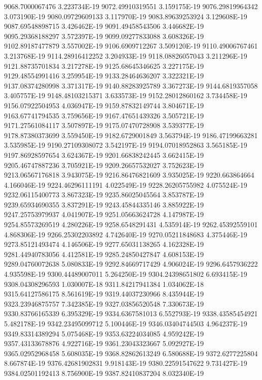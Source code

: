 9068.7000067476  3.223734E-19
9072.49910319551  3.159175E-19
9076.29819964342  3.073190E-19
9080.09729609133  3.117970E-19
9083.89639253924  3.129608E-19
9087.69548898715  3.426462E-19
9091.49458543506  3.446682E-19
9095.29368188297  3.572397E-19
9099.09277833088  3.608326E-19
9102.89187477879  3.557002E-19
9106.6909712267  3.509120E-19
9110.49006767461  3.213768E-19
9114.28916412252  3.204933E-19
9118.08826057043  3.211296E-19
9121.88735701834  3.217278E-19
9125.68645346625  3.227175E-19
9129.48554991416  3.259954E-19
9133.28464636207  3.322321E-19
9137.08374280998  3.371317E-19
9140.88283925789  3.367273E-19
9144.6819357058  3.405757E-19
9148.48103215371  3.633573E-19
9152.28012860162  3.734458E-19
9156.07922504953  4.036947E-19
9159.87832149744  3.804671E-19
9163.67741794535  3.759656E-19
9167.47651439326  3.505721E-19
9171.27561084117  3.507897E-19
9175.07470728908  3.539377E-19
9178.87380373699  3.559450E-19
9182.6729001849  3.563794E-19
9186.47199663281  3.535985E-19
9190.27109308072  3.542197E-19
9194.07018952863  3.565185E-19
9197.86928597654  3.624367E-19
9201.66838242445  3.662415E-19
9205.46747887236  3.705921E-19
9209.26657532027  3.752623E-19
9213.06567176818  3.943075E-19
9216.86476821609  3.935025E-19
9220.663864664  4.166046E-19
9224.46296111191  4.022549E-19
9228.26205755982  4.075524E-19
9232.06115400773  3.867323E-19
9235.86025045564  3.853787E-19
9239.65934690355  3.837291E-19
9243.45844335146  3.885922E-19
9247.25753979937  4.041907E-19
9251.05663624728  4.147987E-19
9254.85573269519  4.280226E-19
9258.6548291431  4.535914E-19
9262.45392559101  4.868306E-19
9266.25302203892  4.742640E-19
9270.05211848683  4.375446E-19
9273.85121493474  4.146506E-19
9277.65031138265  4.162328E-19
9281.44940783056  4.412581E-19
9285.24850427847  4.608153E-19
9289.04760072638  5.080833E-19
9292.84669717429  4.906024E-19
9296.6457936222  4.935598E-19
9300.44489007011  5.264250E-19
9304.24398651802  6.693415E-19
9308.04308296593  1.030007E-18
9311.84217941384  1.034062E-18
9315.64127586175  8.561619E-19
9319.44037230966  8.435944E-19
9323.23946875757  7.342385E-19
9327.03856520548  7.330673E-19
9330.83766165339  6.395329E-19
9334.6367581013  6.552793E-19
9338.43585454921  5.482178E-19
9342.23495099712  5.100446E-19
9346.03404744503  4.964237E-19
9349.83314389294  5.075468E-19
9353.63224034085  4.959242E-19
9357.43133678876  4.922716E-19
9361.23043323667  5.092927E-19
9365.02952968458  5.608035E-19
9368.82862613249  6.580688E-19
9372.6277225804  8.667874E-19
9376.42681902831  9.918143E-19
9380.22591547622  9.731427E-19
9384.02501192413  8.756900E-19
9387.82410837204  8.032340E-19
